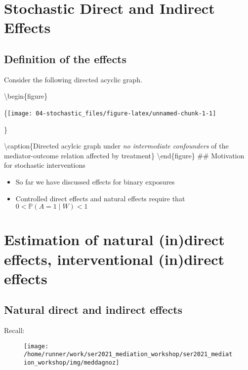 \documentclass[
  12pt, krantz2,
]{book}
\providecommand{\tightlist}{%
  \setlength{\itemsep}{0pt}\setlength{\parskip}{0pt}}
\theoremstyle{definition}
\theoremstyle{definition}
\theoremstyle{definition}
\renewcommand{\P}{\mathbb{P}}
\newcommand{\1}{\mathbbm{1}}
\begin{document}
\hypertarget{stochastic}{%
\chapter{Stochastic Direct and Indirect Effects}\label{stochastic}}

\hypertarget{definition-of-the-effects-1}{%
\section{Definition of the effects}\label{definition-of-the-effects-1}}

Consider the following directed acyclic graph.

\textbackslash begin\{figure\}

\{\centering \texttt{[image: 04-stochastic\_files/figure-latex/unnamed-chunk-1-1]}

\}

\textbackslash caption\{Directed acylcic graph under \emph{no intermediate confounders} of the mediator-outcome relation affected by treatment\}\label{fig:unnamed-chunk-1}
\textbackslash end\{figure\}
\#\# Motivation for stochastic interventions

\begin{itemize}
\tightlist
\item
  So far we have discussed effects for binary exposures
\item
  Controlled direct effects and natural effects require that \(0 < \P(A=1\mid W) < 1\)
\end{itemize}

\hypertarget{estimation-of-natural-indirect-effects-interventional-indirect-effects}{%
\chapter{Estimation of natural (in)direct effects, interventional (in)direct effects}\label{estimation-of-natural-indirect-effects-interventional-indirect-effects}}

\hypertarget{natural-direct-and-indirect-effects-1}{%
\section{Natural direct and indirect effects}\label{natural-direct-and-indirect-effects-1}}

Recall:

\begin{figure}

{\centering \texttt{[image: /home/runner/work/ser2021\_mediation\_workshop/ser2021\_mediation\_workshop/img/meddagnoz]} 

}

\end{figure}
\end{document}
